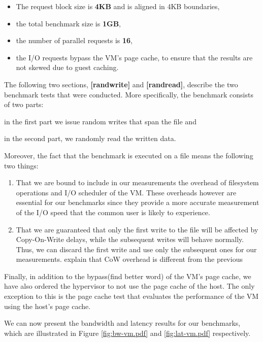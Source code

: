 \begin{itemize}
	\item The request block size is \textbf{4KB} and is aligned in 4KB 
		boundaries,
	\item the total benchmark size is \textbf{1GB},
	\item the number of parallel requests is \textbf{16},
	\item the I/O requests bypass the VM's page cache, to ensure that the 
		results are not skewed due to guest caching.
\end{itemize}			

The following two sections, \textbf{[randwrite]} and \textbf{[randread]}, 
describe the two benchmark tests that were conducted. More specifically, the 
benchmark consists of two parts:
\begin{inparaenum}[i)]
\item in the first part we issue random writes that span the file and
\item in the second part, we randomly read the written data.
\end{inparaenum}

Moreover, the fact that the benchmark is executed on a file means the following 
two things:

\begin{enumerate}
	\item That we are bound to include in our measurements the overhead of 
		filesystem operations and I/O scheduler of the VM. These overheads 
		however are essential for our benchmarks since they provide a more 
		accurate measurement of the I/O speed that the common user is likely to 
		experience.
	\item That we are guaranteed that only the first write to the file will be 
		affected by Copy-On-Write delays, while the subsequent writes will 
		behave normally.  Thus, we can discard the first write and use only
		the subsequent ones for our measurements. \fixme explain that CoW 
		overhead is different from the previous
\end{enumerate}

Finally, in addition to the bypass(\fixme find better word) of the VM's page 
cache, we have also ordered the hypervisor to not use the page cache of the 
host. The only exception to this is the page cache test that evaluates the 
performance of the VM using the host's page cache.

We can now present the bandwidth and latency results for our benchmarks, which 
are illustrated in Figure \ref{fig:bw-vm.pdf} and \ref{fig:lat-vm.pdf} 
respectively. 

